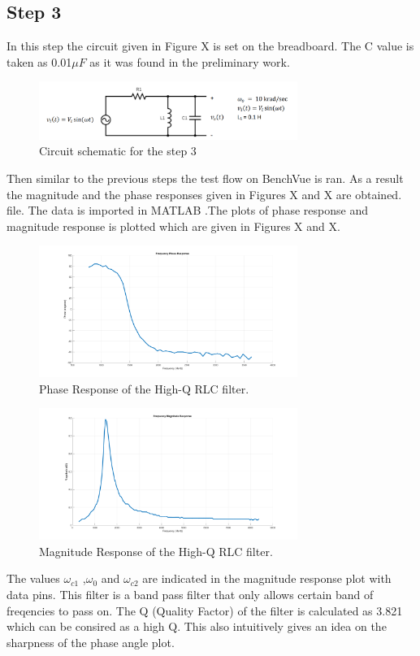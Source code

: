 \documentclass[letterpaper,12pt]{article}
\begin{document}
\subsection{Step 3}
In this step the circuit given in Figure X is set on the breadboard. The C value is taken as 0.01\(\mu F\) as it was found in the preliminary work. 
\begin{figure}[H]
    \centering
    \includegraphics[width = 0.75\textwidth]{highqbandpass.png}
    \caption{Circuit schematic for the step 3}
\end{figure} 
Then similar to the previous steps the test flow on BenchVue is ran. As a result the magnitude and the phase responses given in Figures X and X are obtained. 
file. The data is imported in MATLAB .The plots of phase response and magnitude response is plotted which are given in Figures X and X.
\begin{figure}[H]
    \centering
    \includegraphics[width = 0.75\textwidth]{3_1_2.png}
    \caption{Phase Response of the High-Q RLC filter.}
\end{figure} 

\begin{figure}[H]
    \centering
    \includegraphics[width = 0.75\textwidth]{3_1_1.png}
    \caption{Magnitude Response of the High-Q RLC filter.}
\end{figure} 
The values \(\omega_{c1}\) ,\(\omega_{0}\) and \(\omega_{c2}\)  are indicated in the magnitude response plot with data pins. This filter is a band pass filter that only allows certain band of freqencies to pass on. The Q (Quality Factor) of the filter is calculated as 3.821 which can be consired as a high Q.  This also intuitively gives an idea on the sharpness of the phase angle plot.  
\end{document}
